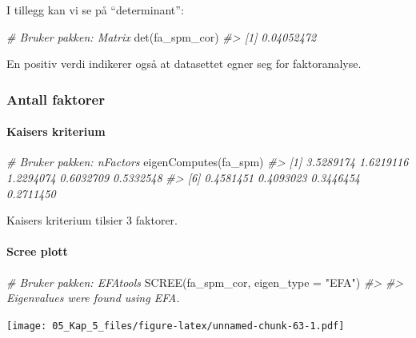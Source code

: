 \documentclass[
]{article}
\newenvironment{Shaded}{\begin{snugshade}}{\end{snugshade}}
\newcommand{\AttributeTok}[1]{\textcolor[rgb]{0.77,0.63,0.00}{#1}}
\newcommand{\CommentTok}[1]{\textcolor[rgb]{0.56,0.35,0.01}{\textit{#1}}}
\newcommand{\FunctionTok}[1]{\textcolor[rgb]{0.00,0.00,0.00}{#1}}
\newcommand{\NormalTok}[1]{#1}
\newcommand{\StringTok}[1]{\textcolor[rgb]{0.31,0.60,0.02}{#1}}
\begin{document}
I tillegg kan vi se på ``determinant'':

\begin{Shaded}
\begin{Highlighting}[]
\CommentTok{\# Bruker pakken: Matrix}
\FunctionTok{det}\NormalTok{(fa\_spm\_cor)}
\CommentTok{\#\textgreater{} [1] 0.04052472}
\end{Highlighting}
\end{Shaded}

En positiv verdi indikerer også at datasettet egner seg for faktoranalyse.

\hypertarget{antall-faktorer}{%
\subsubsection{Antall faktorer}\label{antall-faktorer}}

\hypertarget{kaisers-kriterium-1}{%
\paragraph{Kaisers kriterium}\label{kaisers-kriterium-1}}

\begin{Shaded}
\begin{Highlighting}[]
\CommentTok{\# Bruker pakken: nFactors}
\FunctionTok{eigenComputes}\NormalTok{(fa\_spm)}
\CommentTok{\#\textgreater{} [1] 3.5289174 1.6219116 1.2294074 0.6032709 0.5332548}
\CommentTok{\#\textgreater{} [6] 0.4581451 0.4093023 0.3446454 0.2711450}
\end{Highlighting}
\end{Shaded}

Kaisers kriterium tilsier 3 faktorer.

\hypertarget{scree-plott-2}{%
\paragraph{Scree plott}\label{scree-plott-2}}

\begin{Shaded}
\begin{Highlighting}[]
\CommentTok{\# Bruker pakken: EFAtools}
\FunctionTok{SCREE}\NormalTok{(fa\_spm\_cor, }\AttributeTok{eigen\_type =} \StringTok{"EFA"}\NormalTok{)}
\CommentTok{\#\textgreater{} }
\CommentTok{\#\textgreater{} Eigenvalues were found using EFA.}
\end{Highlighting}
\end{Shaded}

\texttt{[image: 05\_Kap\_5\_files/figure-latex/unnamed-chunk-63-1.pdf]}
\end{document}
